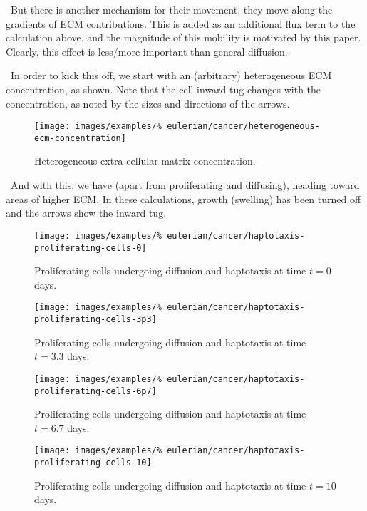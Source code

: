 \textbullet\ But there is another mechanism for their movement, they
move along the gradients of ECM contributions. This is added as an
additional flux term to the calculation above, and the magnitude of
this mobility is motivated by this paper. Clearly, this effect is
less/more important than general diffusion.

\textbullet\ In order to kick this off, we start with an (arbitrary)
heterogeneous ECM concentration, as shown. Note that the cell inward
tug changes with the concentration, as noted by the sizes and
directions of the arrows.

\begin{figure}[!hptb]
\centering
\texttt{[image: images/examples/\%
eulerian/cancer/heterogeneous-ecm-concentration]}
\caption{Heterogeneous extra-cellular matrix concentration.}
\label{heterogeneous-ecm-concentration}
\end{figure}

\textbullet\ And with this, we have (apart from proliferating and
diffusing), heading toward areas of higher ECM. In these calculations,
growth (swelling) has been turned off and the arrows show the inward
tug. 

\begin{figure}[!hptb]
\centering
\texttt{[image: images/examples/\%
eulerian/cancer/haptotaxis-proliferating-cells-0]}
\caption{Proliferating cells undergoing diffusion and haptotaxis at time $t=0$ days.}
\label{tumour-haptotaxis-proliferation-0}
\end{figure}

\begin{figure}[!hptb]
\centering
\texttt{[image: images/examples/\%
eulerian/cancer/haptotaxis-proliferating-cells-3p3]}
\caption{Proliferating cells undergoing diffusion and haptotaxis at time $t=3.3$ days.}
\label{tumour-haptotaxis-proliferation-3p3}
\end{figure}

\begin{figure}[!hptb]
\centering
\texttt{[image: images/examples/\%
eulerian/cancer/haptotaxis-proliferating-cells-6p7]}
\caption{Proliferating cells undergoing diffusion and haptotaxis at time $t=6.7$ days.}
\label{tumour-haptotaxis-proliferation-6p7}
\end{figure}

\begin{figure}[!hptb]
\centering
\texttt{[image: images/examples/\%
eulerian/cancer/haptotaxis-proliferating-cells-10]}
\caption{Proliferating cells undergoing diffusion and haptotaxis at time $t=10$ days.}
\label{tumour-haptotaxis-proliferation-10}
\end{figure}

